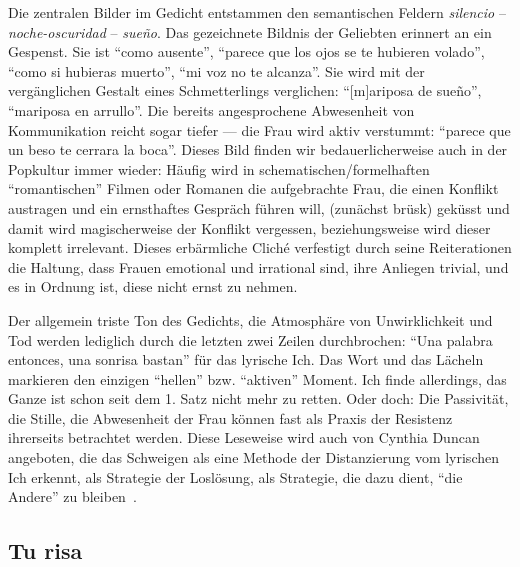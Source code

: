 Die zentralen Bilder im Gedicht entstammen den semantischen Feldern \textit{silencio} -- \textit{noche-oscuridad} -- \textit{sueño}.
Das gezeichnete Bildnis der Geliebten erinnert an ein Gespenst.
Sie ist ``como ausente'', ``parece que los ojos se te hubieren volado'', ``como si hubieras muerto'', ``mi voz no te alcanza''.
Sie wird mit der vergänglichen Gestalt eines Schmetterlings verglichen: ``[m]ariposa de sueño'', ``mariposa en arrullo''.
Die bereits angesprochene Abwesenheit von Kommunikation reicht sogar tiefer — die Frau wird aktiv verstummt: ``parece que un beso te cerrara la boca''.
Dieses Bild finden wir bedauerlicherweise auch in der Popkultur immer wieder:
Häufig wird in schematischen/formelhaften ``romantischen'' Filmen oder Romanen die aufgebrachte Frau, die einen Konflikt austragen und ein ernsthaftes Gespräch führen will, (zunächst brüsk) geküsst und damit wird magischerweise der Konflikt vergessen, beziehungsweise wird dieser komplett irrelevant.
Dieses erbärmliche Cliché verfestigt durch seine Reiterationen die Haltung, dass Frauen emotional und irrational sind, ihre Anliegen trivial, und es in Ordnung ist, diese nicht ernst zu nehmen.

Der allgemein triste Ton des Gedichts, die Atmosphäre von Unwirklichkeit und Tod werden lediglich durch die letzten zwei Zeilen durchbrochen: ``Una palabra entonces, una sonrisa bastan'' für das lyrische Ich.
Das Wort und das Lächeln markieren den einzigen ``hellen'' bzw. ``aktiven'' Moment.
Ich finde allerdings, das Ganze ist schon seit dem 1. Satz nicht mehr zu retten.
Oder doch: Die Passivität, die Stille, die Abwesenheit der Frau können fast als Praxis der Resistenz ihrerseits betrachtet werden.
Diese Leseweise wird auch von Cynthia Duncan angeboten, die das Schweigen als eine Methode der Distanzierung vom lyrischen Ich erkennt, als Strategie der Loslösung, als Strategie, die dazu dient, ``die Andere'' zu bleiben~\cite{Duncan1992}.

\begin{comment}
  * 4 x 4Line verse: Quartette (lookup wie das korrekt heißt auf Deutsch!) + 2 x 2Zeiler (Couplets) --> erinnert ein bisschen an Sonnetform aber nicht ganz (Wie heißen nochma die verschiedene Sonnetformen? Nicht die von Gongora sondern die von Shakespeare meine ich grad: 3x4Zeilen und dann 2)
\end{comment}

\subsection{Tu risa}

